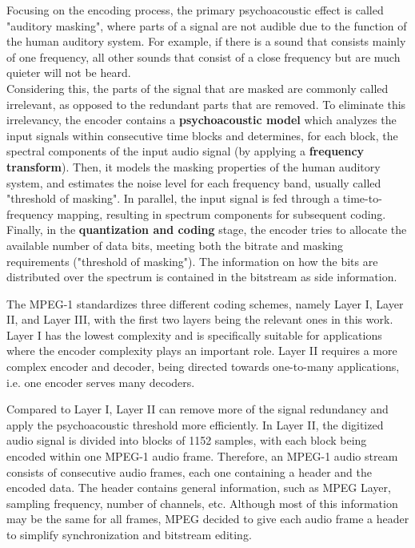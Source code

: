 Focusing on the encoding process, the primary psychoacoustic effect is called "auditory masking", where parts of a signal are not audible due to the function of the human auditory system. For example, if there is a sound that consists mainly of one frequency, all other sounds that consist of a close frequency but are much quieter will not be heard. \\
Considering this, the parts of the signal that are masked are commonly called irrelevant, as opposed to the redundant parts that are removed. %
To eliminate this irrelevancy, the encoder contains a \textbf{psychoacoustic model} which analyzes the input signals within consecutive time blocks and determines, for each block, the spectral components of the input audio signal (by applying a \textbf{frequency transform}). Then, it models the masking properties of the human auditory system, and estimates the noise level for each frequency band, usually called "threshold of masking". 
In parallel, the input signal is fed through a time-to-frequency mapping, resulting in spectrum components for subsequent coding. \\
Finally, in the \textbf{quantization and coding} stage, the encoder tries to allocate the available number of data bits, meeting both the bitrate and masking requirements ("threshold of masking"). The information on how the bits are distributed over the spectrum is contained in the bitstream as side information.

The MPEG-1 standardizes three different coding schemes, namely Layer I, Layer II, and Layer III, with the first two layers being the relevant ones in this work.
Layer I has the lowest complexity and is specifically suitable for applications where the encoder complexity plays an important role.
Layer II requires a more complex encoder and decoder, being directed towards one-to-many applications, i.e. one encoder serves many decoders. 

Compared to Layer I, Layer II can remove more of the signal redundancy and apply the psychoacoustic threshold more efficiently.
In Layer II, the digitized audio signal is divided into blocks of 1152 samples, with each block being encoded within one MPEG-1 audio frame.
Therefore, an MPEG-1 audio stream consists of consecutive audio frames, each one containing a header and the encoded data. The header contains general information, such as MPEG Layer, sampling frequency, number of channels, etc. Although most of this information may be the same for all frames, MPEG decided to give each audio frame a header to simplify synchronization and bitstream editing.

